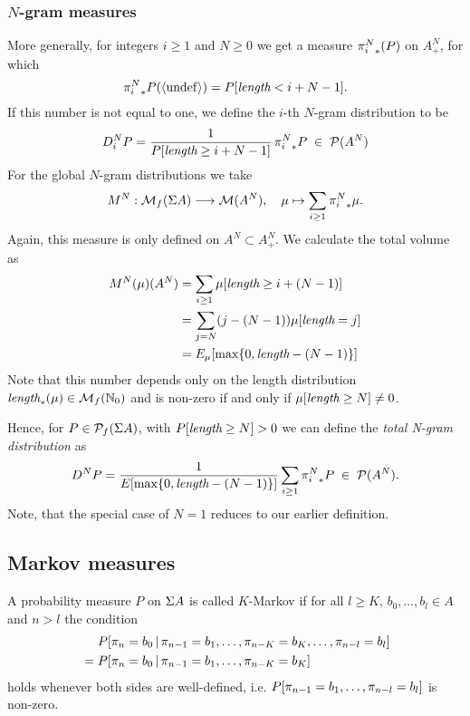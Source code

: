 \documentclass[11pt]{article}
\begin{document}
\subsubsection{$N$-gram measures}

More generally, for integers $i \geq 1$ and $N \geq 0$ we get a
measure ${\pi_{i}^{N}}_*(P)$ on $A^N_+$, for which
\[ {\pi_{i}^{N}}_* P (\langle \mathrm{undef} \rangle) =  P[\text{\it length} < i + N -1]. \]
If this number is not equal to one, we define the $i$-th $N$-gram
distribution to be
\[ D_i^N P = \frac{1}{P[\text{\it length} \geq i+N-1]} \, 
             {\pi_{i}^{N}}_* P \;\in\; \mathcal{P}(A^N) \]
For the global $N$-gram distributions we take
\[ M^N: \mathcal{M}_f(\Sigma A) \longrightarrow \mathcal{M}(A^N), \quad \mu \mapsto \sum_{i
\geq 1} {\pi_{i}^{N}}_* \mu. \]
Again, this measure is only defined on $A^N \subset A^N_+$.
We calculate the total volume as
\begin{align} 
  M^N(\mu)(A^N) &= \sum_{i \geq 1} \mu[\text{\it length} \geq i + (N-1)] \\
                &= \sum_{j = N} (j-(N-1)) \mu[\text{\it length} = j]    \\
                &= E_{\mu}[\max\{ 0, \text{\it length} - (N-1) \} ]  
\end{align}
Note that this number depends only on the length distribution
$\text{\it length}_*(\mu) \in \mathcal{M}_f({\mathbb N}_0)$ and is non-zero if and only if
$\mu[\text{\it length} \geq N] \neq 0$. 

Hence, for $P \in \mathcal{P}_f(\Sigma A)$, with $P[\text{\it length} \geq N] > 0$ we can define the
{\it total N-gram distribution} as
\[ D^N P = \frac{1}{E_{}[\max\{ 0, \text{\it length} - (N-1) \} ]}
           \sum_{i \geq 1} {\pi_{i}^{N}}_* P \;\in\; \mathcal{P}(A^N). \]
Note, that the special case of $N=1$ reduces to our earlier definition.

\subsection{Markov measures}

A probability measure $P$ on $\Sigma A$ is called $K$-Markov if
for all $l \geq K$, $b_0,\dots,b_l \in A$ and $n > l$ the condition
\begin{align*}
  &  P[ {\pi_{n}} = b_0 \,|\, {\pi_{n-1}} = b_1, \dots, {\pi_{n-K}} = b_K, \dots, {\pi_{n-l}} = b_l ] \\  
 \;=\;&  P[ {\pi_{n}} = b_0 \,|\, {\pi_{n-1}} = b_1, \dots, {\pi_{n-K}} = b_K ]
\end{align*}
holds whenever both sides are well-defined, i.e.
$P[{\pi_{n-1}} = b_1,\dots, {\pi_{n-l}} = b_l ]$ is non-zero.
\end{document}
